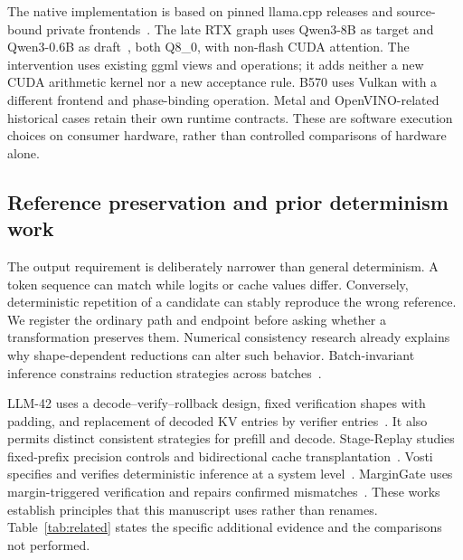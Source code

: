 The native implementation is based on pinned llama.cpp releases and source-bound private frontends~\cite{llamacpp}. The late RTX graph uses Qwen3-8B as target and Qwen3-0.6B as draft~\cite{qwen3}, both Q8\_0, with non-flash CUDA attention. The intervention uses existing ggml views and operations; it adds neither a new CUDA arithmetic kernel nor a new acceptance rule. B570 uses Vulkan with a different frontend and phase-binding operation. Metal and OpenVINO-related historical cases retain their own runtime contracts. These are software execution choices on consumer hardware, rather than controlled comparisons of hardware alone.

\subsection{Reference preservation and prior determinism work}
The output requirement is deliberately narrower than general determinism. A token sequence can match while logits or cache values differ. Conversely, deterministic repetition of a candidate can stably reproduce the wrong reference. We register the ordinary path and endpoint before asking whether a transformation preserves them. Numerical consistency research already explains why shape-dependent reductions can alter such behavior. Batch-invariant inference constrains reduction strategies across batches~\cite{thinkingmachines}.

LLM-42 uses a decode--verify--rollback design, fixed verification shapes with padding, and replacement of decoded KV entries by verifier entries~\cite{llm42}. It also permits distinct consistent strategies for prefill and decode. Stage-Replay studies fixed-prefix precision controls and bidirectional cache transplantation~\cite{stagereplay}. Vosti specifies and verifies deterministic inference at a system level~\cite{vosti}. MarginGate uses margin-triggered verification and repairs confirmed mismatches~\cite{margingate}. These works establish principles that this manuscript uses rather than renames. Table~\ref{tab:related} states the specific additional evidence and the comparisons not performed.

